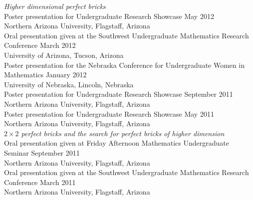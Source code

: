 \documentclass[10pt]{article}
\begin{document}
\noindent \emph{Higher dimensional perfect bricks}\\%
    \indent Poster presentation for Undergraduate Research Showcase \hfill May 2012 \\
    \indent Northern Arizona University, Flagstaff, Arizona \\

	\indent Oral presentation given at the Southwest Undergraduate Mathematics Research Conference \hfill March 2012 \\
	\indent University of Arizona, Tucson, Arizona \\

	\indent Poster presentation for the Nebraska Conference for Undergraduate Women in Mathematics \hfill January 2012 \\
	\indent University of Nebraska, Lincoln, Nebraska \\
	
    \indent Poster presentation for Undergraduate Research Showcase \hfill September 2011 \\
    \indent Northern Arizona University, Flagstaff, Arizona \\


    \indent Poster presentation for Undergraduate Research Showcase \hfill May 2011 \\
    \indent Northern Arizona University, Flagstaff, Arizona \\
    
\noindent \emph{$2 \times 2$ perfect bricks and the search for perfect bricks of higher dimension}\\
	\indent Oral presentation given at Friday Afternoon Mathematics Undergraduate Seminar \hfill September 2011 \\
	\indent Northern Arizona University, Flagstaff, Arizona \\

	\indent Oral presentation given at the Southwest Undergraduate Mathematics Research Conference \hfill March 2011 \\
	\indent Northern Arizona University, Flagstaff, Arizona \\
	
\end{document}

